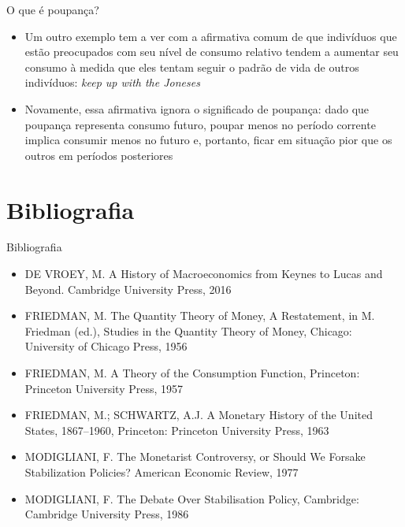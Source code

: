 \documentclass[10pt]{beamer}
\begin{document}
\begin{frame}{O que é poupança?}
    \begin{itemize}
        \item Um outro exemplo tem a ver com a afirmativa comum de que indivíduos que estão preocupados com seu nível de consumo relativo tendem a aumentar seu consumo à medida que eles tentam seguir o padrão de vida de outros indivíduos: \emph{keep up with the Joneses}
        \bigskip
        \item Novamente, essa afirmativa ignora o significado de poupança: dado que poupança representa consumo futuro, poupar menos no período corrente implica consumir menos no futuro e, portanto, ficar em situação pior que os outros em períodos posteriores
    \end{itemize}
\end{frame}

\section{Bibliografia}
\begin{frame}{ Bibliografia}
    \begin{itemize}                        
        \item DE VROEY, M. A History of Macroeconomics from Keynes to Lucas and Beyond. Cambridge University Press, 2016\medskip
        \item FRIEDMAN, M. The Quantity Theory of Money, A Restatement, in M. Friedman (ed.), Studies in the Quantity Theory of Money, Chicago: University of Chicago Press, 1956 \medskip
        \item FRIEDMAN, M. A Theory of the Consumption Function, Princeton: Princeton University Press, 1957\medskip
        \item FRIEDMAN, M.; SCHWARTZ, A.J. A Monetary History of the United States, 1867–1960, Princeton: Princeton University Press, 1963\medskip
        \item MODIGLIANI, F. The Monetarist Controversy, or Should We Forsake Stabilization Policies? American Economic Review, 1977\medskip
        \item MODIGLIANI, F. The Debate Over Stabilisation Policy, Cambridge: Cambridge University Press, 1986\medskip        
    \end{itemize}
\end{frame}
\end{document}
